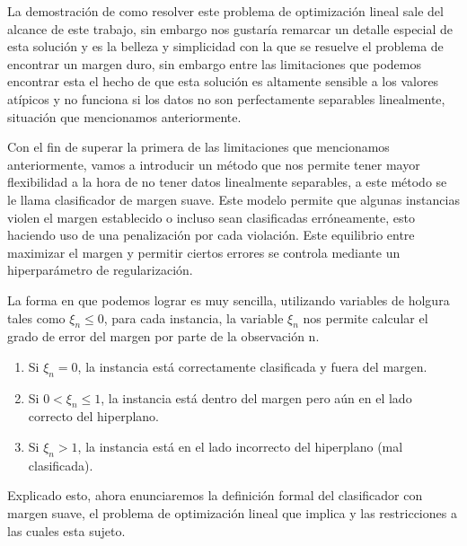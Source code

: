 La demostración de como resolver este problema de optimización lineal sale del alcance de este trabajo, sin embargo nos gustaría remarcar un detalle especial de esta solución y es la belleza y simplicidad con la que se resuelve el problema de encontrar un margen duro, sin embargo entre las limitaciones que podemos encontrar esta el hecho de que esta solución es altamente sensible a los valores atípicos y no funciona si los datos no son perfectamente separables linealmente, situación que mencionamos anteriormente.  

Con el fin de superar la primera de las limitaciones que mencionamos anteriormente, vamos a introducir un método que nos permite tener mayor flexibilidad a la hora de no tener datos linealmente separables, a este método se le llama clasificador de margen suave. Este modelo permite que algunas instancias violen el margen establecido o incluso sean clasificadas erróneamente, esto haciendo uso de una penalización por cada violación. Este equilibrio entre maximizar el margen y permitir ciertos errores se controla mediante un hiperparámetro de regularización.

La forma en que podemos lograr es muy sencilla, utilizando variables de holgura tales como $\xi_n \leq 0$, para cada instancia, la variable $\xi_n$ nos permite calcular el grado de error del margen por parte de la observación n.

\begin{enumerate}
	\item[*] Si $\xi_n=0$, la instancia está correctamente clasificada y fuera del margen.
	\item[*] Si $0 < \xi_n \leq 1$, la instancia está dentro del margen pero aún en el lado correcto del hiperplano.
	\item[*] Si $\xi_n > 1$, la instancia está en el lado incorrecto del hiperplano (mal clasificada).
\end{enumerate}

Explicado esto, ahora enunciaremos la definición formal del clasificador con margen suave, el problema de optimización lineal que implica y las restricciones a las cuales esta sujeto.

